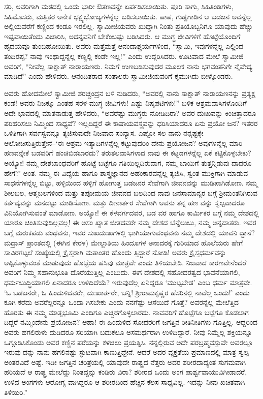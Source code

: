 ಸರಿ, ಅವರಿಗಾಗಿ ಮಠದಲ್ಲಿ ಒಂದು ಭಾರೀ ಔತಣವನ್ನೇ ಏರ್ಪಡಿಸಲಾಯಿತು. ಪೂರಿ ಸಾಗು, ಸಿಹಿತಿಂಡಿಗಳು, ಸಿಹಿಮೊಸರು, ಮತ್ತಿತರ ಅನೇಕ ಭಕ್ಷ್ಯಭೋಜ್ಯಗಳನ್ನೆಲ್ಲ ಬಡಿಸಲಾಯಿತು. ಪಾಪ, ಗುಡ್ಡಗಾಡಿನ ಆ ಬಡಜನ ಅವನ್ನೆಲ್ಲ ಅಲ್ಲಿಯವರೆಗೆ ಕಣ್ಣಿಂದ ಕಂಡೂ ಇರಲಿಲ್ಲ. ಸ್ವಾಮೀಜಿಯವರು ಖುದ್ದಾಗಿ ನಿಂತು ಪ್ರತಿಯೊಬ್ಬನಿಗೂ ಯಾವುದು ಹೆಚ್ಚು ಇಷ್ಟವಾಯಿತೆಂದು ವಿಚಾರಿಸಿ, ಅದನ್ನವನಿಗೆ ಬೇಕೆಂಬಷ್ಟು ಬಡಿಸಿದರು. ಆ ಮುಗ್ಧ ಜೀವಿಗಳಿಗೆ ಹೊಟ್ಟೆಯೊಂದಿಗೆ ಹೃದಯವೂ ತುಂಬಿಹೋಯಿತು. ಅವರು ಮತ್ತೆಮತ್ತೆ ಆನಂದಾಶ್ಚರ್ಯಗಳಿಂದ, “ಸ್ವಾಮಿ, ಇವುಗಳನ್ನೆಲ್ಲ ಎಲ್ಲಿಂದ ತಂದಿರಪ್ಪ? ನಾವು ಇಂಥಾದ್ದನ್ನೆಲ್ಲ ಕಣ್ಣಲ್ಲಿ ಕಂಡೇ ಇಲ್ಲ!” ಎಂದು ಉದ್ಗರಿಸಿದರು. ಊಟವಾದ ಮೇಲೆ ಸ್ವಾಮೀಜಿ ಅವರಿಗೆ, “ನೀವೆಲ್ಲ ಸಾಕ್ಷಾತ್ ನಾರಾಯಣರು. ನಿಮಗೆ ಉಣಬಡಿಸುವುದರ ಮೂಲಕ ನಾನು ಭಗವಂತನಿಗೇ ನೈವೇದ್ಯ ಮಾಡಿದೆ” ಎಂದು ಹೇಳಿದರು. ಆನಂದಿತರಾದ ಸಂತಾಲರು ಸ್ವಾಮೀಜಿಯವರಿಗೆ ಕೈಮುಗಿದು ಬೀಳ್ಕೊಂಡರು.

ಅವರು ಹೋದಮೇಲೆ ಸ್ವಾಮೀಜಿ ಶರಚ್ಚಂದ್ರನ ಬಳಿ ನುಡಿದರು, “ಅವರಲ್ಲಿ ನಾನು ಸಾಕ್ಷಾತ್ ನಾರಾಯಣನನ್ನು ಪ್ರತ್ಯಕ್ಷ ಕಂಡೆ! ಅವರು ನಿಜಕ್ಕೂ ಎಂತಹ ಸರಳ-ಮುಗ್ಧ ಜೀವಿಗಳು! ಎಷ್ಟು ನಿಷ್ಕಪಟಿಗಳು!” ಬಳಿಕ ಆಶ್ರಮವಾಸಿಗಳೊಂದಿಗೆ ಅದೇ ಭಾವದಲ್ಲಿ ಮಾತನಾಡುತ್ತ ಹೇಳಿದರು, “ಅವರೆಷ್ಟು ಮುಗ್ಧರು ನೋಡಿದಿರಾ? ಅವರ ದುಃಖವನ್ನು ಕಿಂಚಿತ್ತಾದರೂ ಪರಿಹರಿಸಲು ನಿಮ್ಮಿಂದ ಸಾಧ್ಯವೆ? ಇಲ್ಲದಿದ್ದರೆ ಈ ಕಾಷಾಯವಸ್ತ್ರವನ್ನು ಧರಿಸಿಯಾದರೂ ಏನು ಪ್ರಯೋ ಜನ? ಇತರರ ಒಳಿತಿಗಾಗಿ ಸರ್ವಸ್ವವನ್ನೂ ತ್ಯಜಿಸುವುದೇ ನಿಜವಾದ ಸಂನ್ಯಾಸ. ಎಷ್ಟೋ ಸಲ ನಾನು ನನ್ನಷ್ಟಕ್ಕೇ ಆಲೋಚಿಸುತ್ತಿರುತ್ತೇನೆ–‘ಈ ಆಶ್ರಮ ಇತ್ಯಾದಿಗಳನ್ನೆಲ್ಲ ಕಟ್ಟುವುದರಿಂ ದೇನು ಪ್ರಯೋಜನ? ಅವುಗಳನ್ನೆಲ್ಲ ಮಾರಿ ಹಣವನ್ನೇಕೆ ಬಡವರಿಗೆ ಹಂಚಿಬಿಡಬಾರದು? ತರುತಲವಾಸಿಗಳಾದ ನಾವು ಈ ಕಟ್ಟಡಗಳನ್ನೆಲ್ಲ ಏಕೆ ಕಟ್ಟಿಕೊಳ್ಳಬೇಕು? ಅಯ್ಯೋ! ನಮ್ಮ ದೇಶಬಾಂಧವರಿಗೆ ಹೊಟ್ಟೆ ಬಟ್ಟೆಗೂ ಗತಿಯಿಲ್ಲದಿರುವಾಗ, ನಮ್ಮ ಬಾಯಿಗೆ ತುತ್ತನ್ನಿಡುವು ದಾದರೂ ಹೇಗೆ?’ ಅಂತ. ನಮ್ಮ ಈ ವಿದ್ಯೆಯ ಹಾಗೂ ಶಾಸ್ತ್ರಜ್ಞಾನದ ಅಹಂಕಾರವನ್ನೆಲ್ಲ ತ್ಯಜಿಸಿ, ಸ್ವಂತ ಮುಕ್ತಿಗಾಗಿ ಮಾಡುವ ಸಾಧನೆಗಳನ್ನೆಲ್ಲ ಬಿಟ್ಟು, ಹಳ್ಳಿಯಿಂದ ಹಳ್ಳಿಗೆ ಹೋಗುತ್ತ ಬಡಜನರ ಸೇವೆಗಾಗಿ ಜೀವನವನ್ನು ಮುಡಿಪಾಗಿಡೋಣ. ನಮ್ಮ ಶೀಲಬಲ, ಆತ್ಮಬಲಗಳಿಂದ ಮತ್ತು ತಪೋಮಯ ಜೀವನದ ಬಲದಿಂದ ನಾವು ಜನಸಾಮಾನ್ಯರ ಬಗ್ಗೆ ಶ್ರೀಮಂತನಿಗಿರುವ ಕರ್ತವ್ಯವನ್ನು ಮನದಟ್ಟು ಮಾಡಿಸೋಣ. ಮತ್ತು ದೀನಾರ್ತರ ಸೇವೆಗಾಗಿ ಅವನು ತನ್ನ ಹಣ ವನ್ನು ಸ್ವಲ್ಪವಾದರೂ ವಿನಿಯೋಗಿಸುವಂತೆ ಮಾಡೋಣ. ಅಯ್ಯೋ! ಈ ಕೆಳವರ್ಗದವರ, ಬಡ ವರ ಹಾಗೂ ಕಾರ್ಮಿಕರ ಬಗ್ಗೆ ನಮ್ಮ ದೇಶದಲ್ಲಿ ಯಾರೂ ಚಿಂತಿಸುವುದಿಲ್ಲವಲ್ಲ! ಈ ಅಸಂ ಖ್ಯಾತ ಜೀತದವರೇ ನಮ್ಮ ದೇಶದ ಬೆನ್ನೆಲುಬು, ನಮ್ಮ ಅನ್ನದಾತರು. ಇವರ ಬಗ್ಗೆ ಮರುಕಪಡು ವಂಥವನು, ಇವರ ಸುಖದುಃಖಗಳಲ್ಲಿ ಭಾಗಿಯಾಗುವಂಥವನು ನಮ್ಮ ದೇಶದಲ್ಲಿ ಯಾವನಿ ದ್ದಾನೆ? ಮದ್ರಾಸ್ ಪ್ರಾಂತದಲ್ಲಿ (ಈಗಿನ ಕೇರಳ) ಮೇಲ್ಜಾತಿಯ ಹಿಂದೂಗಳ ಅನಾದರಕ್ಕೆ ಗುರಿಯಾದ ಹೊಲೆಯರು ಹೇಗೆ ಸಾವಿರಗಟ್ಟಲೆ ಸಂಖ್ಯೆಯಲ್ಲಿ ಕ್ರೈಸ್ತರಾಗಿ ಮತಾಂತರ ಹೊಂದು ತ್ತಿದ್ದಾರೆ ನೋಡಿ! ಅವರು ಕ್ರೈಸ್ತಧರ್ಮವನ್ನು ಅಪ್ಪಿಕೊಳ್ಳುವಂತೆ ಮಾಡುವುದು ಹೊಟ್ಟೆಯ ಹಸಿವು ಮಾತ್ರವೇ ಎಂದು ತಿಳಿಯಬೇಡಿ. ನಿಜವಾದ ಕಾರಣವೇನೆಂದರೆ ಅವರಿಗೆ ನಿಮ್ಮ ಸಹಾನುಭೂತಿ ದೊರೆಯುತ್ತಿಲ್ಲ ಎಂಬುದು. ಈಗ ದೇಶದಲ್ಲಿ ಸಹೋದರತ್ವದ ಭಾವನೆಯಾಗಲಿ, ಧರ್ಮಬುದ್ಧಿಯಾಗಲಿ ಏನಾದರೂ ಉಳಿದಿದೆಯೆ? ಇರುವುದೆಲ್ಲ ಏನಿದ್ದರೂ ‘ಮುಟ್ಟಬೇಡ’ ಎಂಬ ಧರ್ಮ ಮಾತ್ರವೇ. ‘ಓ ಬಡಜನರೇ, ಓ ಹಿಂದುಳಿದವರೇ, ದುಃಖಾರ್ತರೇ, ಬನ್ನಿ! ಶ್ರೀರಾಮಕೃಷ್ಣರ ಹೆಸರಿನಲ್ಲಿ ನಾವೆಲ್ಲ ಒಂದು!’ ಎಂದು ಕೂಗಿ ಕರೆದು ಅವರೆಲ್ಲರನ್ನೂ ಒಂದಾ ಗಿಸಬೇಕು ಎಂದು ನನಗೆಷ್ಟು ಆಸೆಯಿದೆ ಗೊತ್ತೆ? ಅವರನ್ನೆಲ್ಲ ಮೇಲೆತ್ತಿದ ಹೊರತು ಈ ನಮ್ಮ ಮಾತೃಭೂಮಿ ಎಂದಿಗೂ ಎಚ್ಚರಗೊಳ್ಳಲಾರದು. ನಾವವರಿಗೆ ಹೊಟ್ಟೆಗೂ ಬಟ್ಟೆಗೂ ಕೊಡಲಾಗ ದಿದ್ದರೆ ನಮ್ಮಿಂದೇನು ಪ್ರಯೋಜನ? ಆಹಾ! ಈ ಹಿಂದುಳಿದ ಸೋದರರಿಗೆ ಜಗತ್ತಿನ ರೀತಿನೀತಿಗಳು ಗೊತ್ತಿಲ್ಲ. ಆದ್ದರಿಂದ ಅವರು ಹಗಲಿರುಳು ದುಡಿದರೂ ಸರಿಯಾಗಿ ಬದುಕಲೂ ಅಸಮರ್ಥರಾಗಿ ಉಳಿದಿದ್ದಾರೆ. ನೀವು ನಿಮ್ಮೆಲ್ಲ ಶಕ್ತಿಯನ್ನೂ ಒಗ್ಗೂಡಿಸಿಕೊಂಡು ಅವರ ಕಣ್ಣಿನ ಪರೆಯನ್ನು ಕಳಚಲು ಪ್ರಯತ್ನಿಸಿ. ನನ್ನಲ್ಲಿರುವ ಅದೇ ಪರಬ್ರಹ್ಮವಸ್ತುವೇ ಅವರಲ್ಲೂ ಇರುವು ದನ್ನು ನಾನು ಹಗಲಿನಷ್ಟು ಸ್ಫುಟವಾಗಿ ಕಾಣುತ್ತಿದ್ದೇನೆ. ಆದರೆ ಅದರ ವ್ಯಕ್ತತೆಯ ಪ್ರಮಾಣದಲ್ಲಿ ಮಾತ್ರ ಸ್ವಲ್ಪ ಅಂತರವಿದೆ ಅಷ್ಟೆ. ಇಡೀ ಜಗತ್ತಿನ ಚರಿತ್ರೆಯಲ್ಲಿ ಯಾವುದೇ ರಾಷ್ಟ್ರದ ನೆತ್ತರು ಅದರ ಶರೀರದಾದ್ಯಂತ ಸುಗಮವಾಗಿ ಹರಿಯದೆ ಆ ರಾಷ್ಟ್ರ ಮೇಲೆದ್ದು ನಿಂತದ್ದನ್ನು ಕಂಡಿರು ವಿರಾ? ಶರೀರದ ಒಂದು ಅಂಗ ಪಾರ್ಶ್ವವಾಯುವಿಗೀಡಾದರೆ, ಉಳಿದ ಅಂಗಗಳು ಆರೋಗ್ಯ ವಾಗಿದ್ದರೂ ಆ ಶರೀರದಿಂದ ಹೆಚ್ಚಿನ ಕೆಲಸ ಸಾಧ್ಯವಿಲ್ಲ. ಇದನ್ನು ನೀವು ಖಚಿತವಾಗಿ ತಿಳಿಯಿರಿ.”

